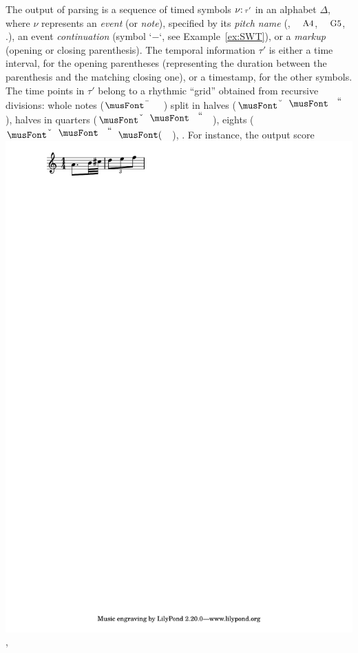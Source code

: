 \begin{example}
The output of parsing is a sequence of
timed symbols $\nu\mathpunct{:}{\scriptstyle \tau'}$ in an alphabet $\Delta$,
where $\nu$  represents
an \emph{event} (or \emph{note}),
specified by its \emph{pitch name}
(\eg, $\mbox{\footnotesize A4}$, $\mbox{\footnotesize G5}$, \etc.),
an event \emph{continuation} (symbol `$-$`, see Example~\ref{ex:SWT}),
or a \emph{markup} (opening or closing parenthesis). %
The temporal information $\tau'$ 
is either a time interval, for the opening parentheses
(representing the duration between the parenthesis 
 and the matching closing one), 
or a timestamp, for the other symbols.
The time points in $\tau'$ belong to a rhythmic ``grid'' obtained from recursive divisions:
whole notes ($\musWhole$) split in halves ($\musHalf$), halves
in quarters ($\musQuarter$), eights ($\musEighth$), \etc.
%
For instance, the output score
\includegraphics[scale=0.35,trim=0 5mm 0 0]{pictures/ex1.pdf},

\end{example}
